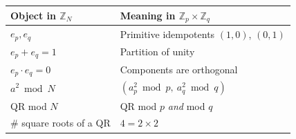 \begin{center}
\begin{tabular}{ll}
    \hline
    \textbf{Object in $\mathbb{Z}_N$} & \textbf{Meaning in $\mathbb{Z}_p \times \mathbb{Z}_q$} \\
    \hline
    $e_p, e_q$ & Primitive idempotents $(1,0)$, $(0,1)$ \\
    $e_p + e_q = 1$ & Partition of unity \\
    $e_p \cdot e_q = 0$ & Components are orthogonal \\
    $a^2 \bmod N$ & $(a_p^2 \bmod p,\ a_q^2 \bmod q)$ \\
    QR mod $N$ & QR mod $p$ \emph{and} mod $q$ \\
    \# square roots of a QR & $4 = 2 \times 2$ \\
    \hline
\end{tabular}
\end{center}
